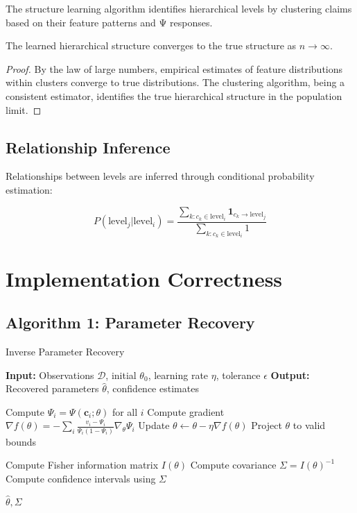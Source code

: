 \documentclass[11pt]{article}
\begin{document}
The structure learning algorithm identifies hierarchical levels by clustering claims based on their feature patterns and Ψ responses.

\begin{theorem}
The learned hierarchical structure converges to the true structure as $n \to \infty$.
\end{theorem}

\begin{proof}
By the law of large numbers, empirical estimates of feature distributions within clusters converge to true distributions. The clustering algorithm, being a consistent estimator, identifies the true hierarchical structure in the population limit.
\end{proof}

\subsection{Relationship Inference}

Relationships between levels are inferred through conditional probability estimation:

\[
P(\text{level}_j | \text{level}_i) = \frac{\sum_{k: c_k \in \text{level}_i} \mathbf{1}_{c_k \to \text{level}_j}}{\sum_{k: c_k \in \text{level}_i} 1}
\]

\section{Implementation Correctness}

\subsection{Algorithm 1: Parameter Recovery}

\begin{algorithm}
\caption{Inverse Parameter Recovery}
\begin{algorithmic}
\STATE \textbf{Input:} Observations $\mathcal{D}$, initial $\theta_0$, learning rate $\eta$, tolerance $\epsilon$
\STATE \textbf{Output:} Recovered parameters $\hat{\theta}$, confidence estimates

\REPEAT
    \STATE Compute $\Psi_i = \Psi(\mathbf{c}_i; \theta)$ for all $i$
    \STATE Compute gradient $\nabla f(\theta) = -\sum_i \frac{v_i - \Psi_i}{\Psi_i (1-\Psi_i)} \nabla_\theta \Psi_i$
    \STATE Update $\theta \leftarrow \theta - \eta \nabla f(\theta)$
    \STATE Project $\theta$ to valid bounds

\STATE Compute Fisher information matrix $I(\theta)$
\STATE Compute covariance $\Sigma = I(\theta)^{-1}$
\STATE Compute confidence intervals using $\Sigma$

\RETURN $\hat{\theta}, \Sigma$
\end{algorithmic}
\end{algorithm}
\end{document}
